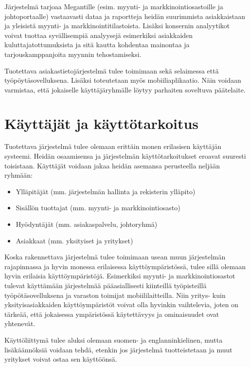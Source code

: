     Järjestelmä tarjoaa Megantille (esim. myynti- ja markkinointiosastoille ja johtoportaalle) vastaavasti dataa ja raportteja heidän 
    suurimmista asiakkaistaan ja yleisistä myynti- ja markkinointitilastoista. Lisäksi konsernin analyytikot voivat tuottaa syvällisempiä 
    analyysejä esimerkiksi asiakkaiden kuluttajatottumuksista ja sitä kautta kohdentaa mainontaa ja tarjouskamppanjoita myynnin tehostamiseksi.

    Tuotettava asiakastietojärjestelmä tulee toimimaan sekä selaimessa että työpöytä\-sovelluksena. Lisäksi toteutetaan myös mobiiliaplikaatio.
    Näin voidaan varmistaa, että jokaiselle käyttäjäryhmälle löytyy parhaiten soveltuva päätelaite.


\section{Käyttäjät ja käyttötarkoitus}

    Tuotettava järjestelmä tulee olemaan erittäin monen erilasisen käyttäjän systeemi. Heidän osaamisensa ja järjestelmän käyttötarkoitukset eroavat suuresti
    toisistaan. Käyttäjät voidaan jakaa heidän asemansa perusteella neljään ryhmään:

    \begin{itemize}
        \item Ylläpitäjät (mm. järjestelmän hallinta ja rekisterin ylläpito)
        \item Sisällön tuottajat (mm. myynti- ja markkinointiosasto)
        \item Hyödyntäjät (mm. asiakaspalvelu, johtoryhmä)
        \item Asiakkaat (mm. yksityiset ja yritykset)
    \end{itemize}

    Koska rakennettava järjestelmä tulee toimimaan usean muun järjestelmän rajapinnassa ja hyvin monessa erilaisessa käyttöympäristössä,
    tulee sillä olemaan hyvin erilaisia käyttöympäristöjä. Esimerkiksi myynti- ja markkinointiosastot tulevat käyttämään järjestelmää 
    pääasiallisesti kiinteillä työpisteillä työpötäsovelluksena ja varaston toimijat mobiililaitteilla. Niin yritys- kuin yksityisasiakkaiden 
    käyttöympäristöt voivat olla hyvinkin vaihtelevia, joten on tärkeää, että jokaisessa ympäristössä käytettävyys ja ominaisuudet ovat yhtenevät.

    Käyttöliittymä tulee aluksi olemaan suomen- ja englanninkielinen, mutta lisäkäännöksiä voidaan tehdä, etenkin jos järjestelmä tuotteistetaan
    ja muut yritykset voivat ostaa sen käyttöönsä.

